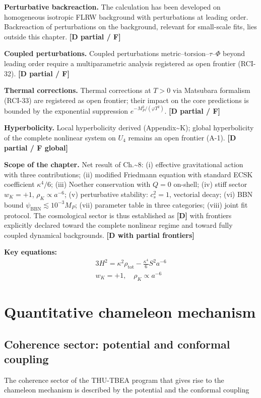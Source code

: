 ﻿\documentclass[11pt,letterpaper]{article}
\begin{document}
\textbf{Perturbative backreaction.} The calculation has been developed on homogeneous isotropic FLRW background with perturbations at leading order. Backreaction of perturbations on the background, relevant for small-scale fits, lies outside this chapter. \textbf{[D partial / F]}

\textbf{Coupled perturbations.} Coupled perturbations metric--torsion--$\tau$--$\Phi$ beyond leading order require a multiparametric analysis registered as open frontier (RCI-32). \textbf{[D partial / F]}

\textbf{Thermal corrections.} Thermal corrections at $T > 0$ via Matsubara formalism (RCI-33) are registered as open frontier; their impact on the core predictions is bounded by the exponential suppression $e^{-M_P^2/(\varphi T^2)}$. \textbf{[D partial / F]}

\textbf{Hyperbolicity.} Local hyperbolicity derived (Appendix\textasciitilde{}K); global hyperbolicity of the complete nonlinear system on $U_4$ remains an open frontier (A-1). \textbf{[D partial / F global]}

\textbf{Scope of the chapter.} Net result of Ch.\textasciitilde{}8: (i) effective gravitational action with three contributions; (ii) modified Friedmann equation with standard ECSK coefficient $\kappa^4/6$; (iii) Noether conservation with $Q = 0$ on-shell; (iv) stiff sector $w_K = +1$, $\rho_K \propto a^{-6}$; (v) perturbative stability: $c_s^2 = 1$, vectorial decay; (vi) BBN bound $\psi_{\text{BBN}} \lesssim 10^{-3}M_P$; (vii) parameter table in three categories; (viii) joint fit protocol. The cosmological sector is thus established as \textbf{[D]} with frontiers explicitly declared toward the complete nonlinear regime and toward fully coupled dynamical backgrounds. \textbf{[D with partial frontiers]}

\textbf{Key equations:}
\begin{align*}
    3H^2 = \kappa^2\rho_{\mathrm{tot}} - \frac{\kappa^4}{6}S^2 a^{-6} \\
    w_K = +1, \quad \rho_K \propto a^{-6}
\end{align*}
\section{Quantitative chameleon mechanism}
\subsection{Coherence sector: potential and conformal coupling}
The coherence sector of the THU-TBEA program that gives rise to the chameleon mechanism is described by the potential and the conformal coupling
\end{document}
